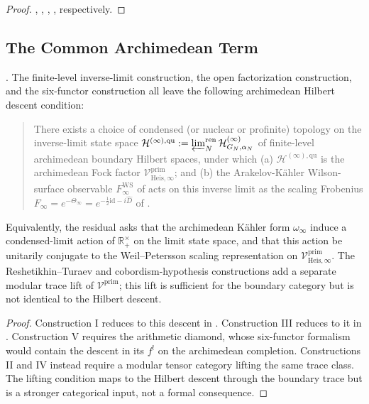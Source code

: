\begin{proof}
,
,
,
,
 respectively.
\end{proof}

\subsection{The Common Archimedean Term}
\label{v4-arith:w10-a:common-residual}

\begin{theorem}
\label{v4-arith:w10-a:thm:common-residual}
\ClaimStatusProvedHere. The finite-level inverse-limit construction,
the open factorization construction, and the six-functor construction
all leave the following archimedean Hilbert descent condition:
\begin{quote}
There exists a choice of condensed (or nuclear or profinite) topology
on the inverse-limit state space
\(\mathcal H^{(\infty),\mathrm{qu}}:=\varprojlim_{N}^{\mathrm{ren}}\mathcal H^{(\infty)}_{G_{N},\alpha_{N}}\)
of finite-level archimedean boundary Hilbert spaces, under which (a)
\(\mathcal H^{(\infty),\mathrm{qu}}\) is the archimedean Fock factor
\(\mathcal V^{\mathrm{prim}}_{\mathrm{Heis},\infty}\); and (b) the
Arakelov-K\"ahler Wilson-surface observable \(F_{\infty}^{\mathrm{WS}}\)
of  acts on this inverse limit
as the scaling Frobenius \(F_{\infty}=e^{-\Theta_{\infty}}
=e^{-\frac12\mathrm{id}-i\widehat D}\) of
.
\end{quote}
Equivalently, the residual asks that the archimedean K\"ahler form
\(\omega_{\infty}\) induce a condensed-limit action of
\(\mathbb{R}^{\times}_{+}\) on the limit state space, and that this
action be unitarily conjugate to the Weil--Petersson scaling
representation on \(\mathcal V^{\mathrm{prim}}_{\mathrm{Heis},\infty}\).
The Reshetikhin--Turaev and cobordism-hypothesis constructions add a
separate modular trace lift of
\(\mathcal V^{\mathrm{prim}}\); this lift is sufficient for the
boundary category but is not identical to the Hilbert descent.
\end{theorem}

\begin{proof}
Construction I reduces to this descent in
. Construction III reduces to it
in . Construction V
requires the arithmetic diamond, whose six-functor formalism would
contain the descent in its \(f^{!}\) on the archimedean completion.
Constructions II and IV instead require a modular tensor category
lifting the same trace class. The lifting condition maps to the
Hilbert descent through the boundary trace but is a stronger
categorical input, not a formal consequence.
\end{proof}

